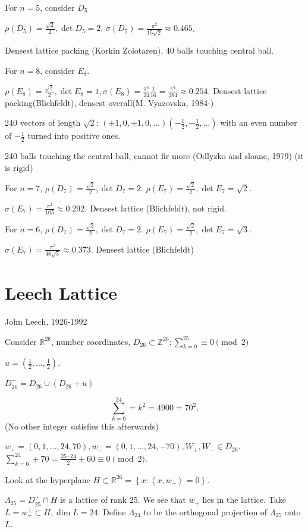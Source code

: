 \documentclass{report}
\newcommand{\R}{\mathbb{R}}
\newcommand{\Z}{\mathbb{Z}}
\newcommand{\inner}[2]{\left\langle #1, #2\right\rangle}
\newcommand{\set}[1]{\left\{ #1 \right\}}
\theoremstyle{definition}
\theoremstyle{remark}
\numberwithin{equation}{section}
\begin{document}
For $n = 5$, consider $D_5$

$\rho(D_5) = \frac{\sqrt{2}}{2}, \det D_5 = 2$. $\sigma(D_5) = \frac{\pi^2}{15\sqrt{2}} \approx 0.465$. 

Densest lattice packing (Korkin Zolotaren), 40 balls touching central ball.

For $n = 8$, consider $E_8$.

$\rho(E_8) = \frac{\sqrt{2}}{2}, \det E_8 = 1, \sigma(E_8) = \frac{\pi^4}{24}\frac{1}{16}=\frac{\pi^4}{384}\approx0.254$.
Densest lattice packing(Blichfeldt), densest overall(M. Vyazovska, 1984-)

240 vectors of length $\sqrt{2}$: $(\pm1, 0, \pm1, 0, \ldots) \left(-\frac{1}{2}, -\frac{1}{2}, \ldots\right)$ with an even number of $-\frac{1}{2}$ turned into positive ones.

240 balls touching the central ball, cannot fir more (Odlyzko and sloane, 1979) (it is rigid)

For $n = 7$, $\rho(D_7) = \frac{\sqrt{2}}{2}, \det D_7 = 2$. $\rho(E_7) = \frac{\sqrt{2}}{2}, \det E_7 = \sqrt{2}$.

$\sigma(E_7) = \frac{\pi^3}{105}\approx0.292$. Densest lattice (Blichfeldt), not rigid.

For $n = 6$, $\rho(D_7) = \frac{\sqrt{2}}{2}, \det D_7 = 2$. $\rho(E_7) = \frac{\sqrt{2}}{2}, \det E_7 = \sqrt{3}$.

$\sigma(E_7) = \frac{\pi^3}{48\sqrt{3}}\approx0.373$. Densest lattice (Blichfeldt)

\section{Leech Lattice}
John Leech, 1926-1992

Consider $\R^{26}$, number coordinates,
$D_{26} \subset \Z^{26}: \sum_{k=0}^25 \equiv 0 \pmod{2}$

$u = \left(\frac{1}{2}, \ldots, \frac{1}{2}\right)$.

$D_{26}^+ = D_{26} \cup (D_{26} + u)$

\[\sum_{k=0}^{24} = k^2 = 4900 = 70^2.\]
(No other integer satisfies this afterwards)

$w_+ = (0, 1, \ldots, 24, 70), w_- = (0, 1, \ldots, 24, -70), W_+, W_- \in D_{26}$. $\sum_{k=0}^{24} \pm 70 = \frac{25 \cdot 24}{2}\pm 60 \equiv 0 \pmod{2}$.

Look at the hyperplane $H \subset \R^{26} = \set{x: \inner{x}{w_-} = 0}$.

$\Lambda_{25} = D^+_{25} \cap H$ is a lattice of rank 25. We see that $w_+$ lies in the lattice. Take $L = w_+^{\perp} \subset H, \dim L = 24.$ Define $\Lambda_{24}$ to be the orthogonal projection of $\Lambda_{25}$ onto $L$.
\end{document}
